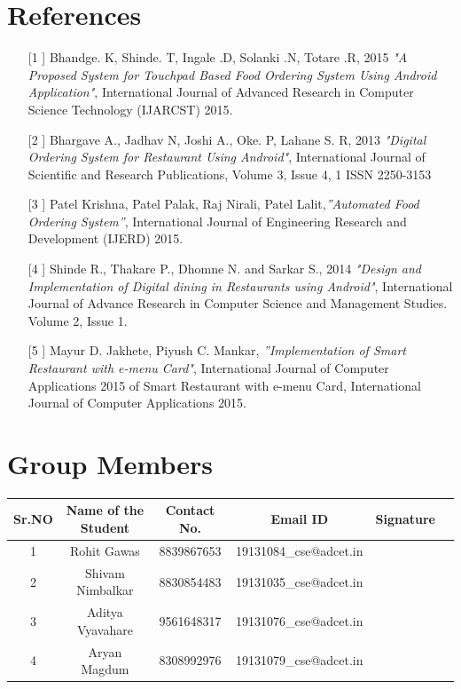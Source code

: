 \documentclass[english]{article}
\begin{document}

\section*{References}
\vspace{20pt}


\begin{itemize}
\item[[1]] Bhandge. K, Shinde. T, Ingale .D, Solanki .N, Totare .R, 2015 \emph{"A Proposed
System for Touchpad Based Food Ordering System Using Android
Application"}, International Journal  of Advanced Research in Computer
Science Technology (IJARCST) 2015.

\item [[2]] Bhargave A., Jadhav N, Joshi A., Oke. P, Lahane S. R, 2013 \emph{"Digital
Ordering System for Restaurant Using Android"}, International Journal of
Scientific and Research Publications, Volume 3, Issue 4, 1 ISSN 2250-3153
\item [[3]] Patel Krishna, Patel Palak, Raj Nirali, Patel Lalit,\emph{”Automated Food Ordering System”}, International Journal of
Engineering Research and Development (IJERD) 2015.
\item [[4]] Shinde R., Thakare P., Dhomne N. and Sarkar S., 2014 \emph{"Design and
Implementation of Digital dining in Restaurants using Android"},
International Journal of Advance Research in Computer Science and
Management Studies. Volume 2, Issue 1.
\item [[5]] Mayur D. Jakhete, Piyush C. Mankar, \emph{”Implementation of
Smart Restaurant with e-menu Card"}, International Journal
of Computer Applications 2015 of Smart Restaurant with e-menu Card, International Journal of Computer Applications
2015.

\end{itemize}
\vspace{20pt}

\section*{Group Members}
\vspace{20pt}

\centering
\begin{tabular}{ | c | c | c | c | c | c |}
     
\hline \bf{Sr.NO} &\textbf{Name of the Student} &\textbf{Contact No.} &\textbf{Email ID} 
&\textbf{Signature}  \\ 
     \hline    1& Rohit Gawas &8839867653 &19131084\_cse@adcet.in &\\ 
     \hline    2 &Shivam Nimbalkar &8830854483 & 19131035\_cse@adcet.in&\\ 
     \hline    3& Aditya Vyavahare& 9561648317&19131076\_cse@adcet.in &    \\
     \hline  4 &Aryan Magdum & 8308992976&19131079\_cse@adcet.in & \\ 

     \hline
    
      
\end{tabular}
\end{document}
